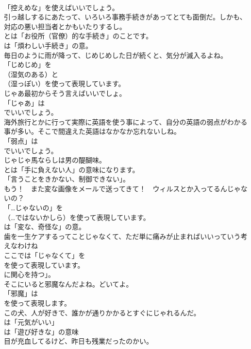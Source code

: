\documentclass[8pt]{extreport}
\begin{document}
\begin{CJK}{UTF8}{min}
\\	「控えめな」を使えばいいでしょう。	
\\	引っ越しするにあたって、いろいろ事務手続きがあってとても面倒だ。しかも、対応の悪い担当者とかもいたりするし。 
\\	とは「お役所（官僚）的な手続き」のことです。
\\	は「煩わしい手続き」の意。	
\\	毎日のように雨が降って、じめじめした日が続くと、気分が滅入るよね。 
\\	「じめじめ」を 
\\	（湿気のある）と 
\\	（湿っぽい）を使って表現しています。	
\\	じゃあ最初からそう言えばいいでしょ。 
\\	「じゃあ」は 
\\	でいいでしょう。	
\\	海外旅行とかに行って実際に英語を使う事によって、自分の英語の弱点がわかる事が多い。そこで間違えた英語はなかなか忘れないしね。 
\\	「弱点」は
\\	でいいでしょう。	
\\	じゃじゃ馬ならしは男の醍醐味。 
\\	とは「手に負えない人」の意味になります。
\\	「言うことをきかない、制御できない」。	
\\	もう！　また変な画像をメールで送ってきて！　ウィルスとか入ってるんじゃないの？ 
\\	「…じゃないの」を 
\\	（…ではないかしら）を使って表現しています。
\\	は「変な、奇怪な」の意。	
\\	歯を一生ケアするってことじゃなくて、ただ単に痛みが止まればいいっていう考えなわけね 
\\	ここでは「じゃなくて」を
\\	を使って表現しています。
\\	に関心を持つ」。	
\\	そこにいると邪魔なんだよね。どいてよ。 
\\	「邪魔」は
\\	を使って表現します。	
\\	この犬、人が好きで、誰かが通りかかるとすぐにじゃれるんだ。 
\\	は「元気がいい」
\\	は「遊び好きな」の意味	
\\	目が充血してるけど、昨日も残業だったのかい。 

\end{CJK}
\end{document}
